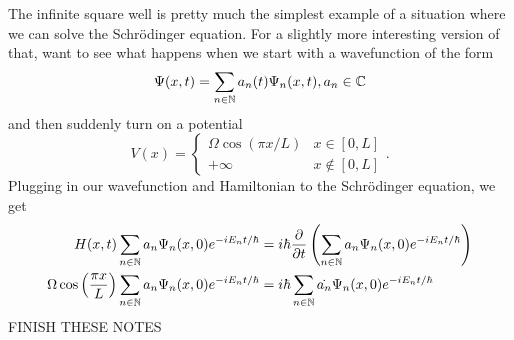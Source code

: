 \documentclass{article}
\begin{document}
The infinite square well is pretty much the simplest example of a situation where we can solve the Schrödinger equation. For a slightly more interesting version of that, want to see what happens when we start with a wavefunction of the form
\[ \Psi(x,t) = \sum_{n \in \mathbb{N}} a_n(t) \Psi_n(x, t), a_n \in \mathbb{C} \]
and then suddenly turn on a potential
\[ V(x) = \begin{cases}
    \Omega \cos (\pi x /L) & x \in [0, L] \\
    +\infty & x \not\in [0, L]
\end{cases}. \]
Plugging in our wavefunction and Hamiltonian to the Schrödinger equation, we get
\begin{align*}
    H(x, t) \sum_{n \in \mathbb{N}} a_n \Psi_n(x, 0) e^{-i E_n t / \hbar} &= i \hbar \frac{\partial}{\partial t} \left( \sum_{n \in \mathbb{N}} a_n \Psi_n(x, 0) e^{-i E_n t / \hbar} \right) \\
\Omega \cos \left( \frac{\pi x}{L} \right)  \sum_{n \in \mathbb{N}} a_n \Psi_n(x, 0) e^{-i E_n t / \hbar} &= i \hbar \sum_{n \in \mathbb{N}} \dot{a_n} \Psi_n(x, 0) e^{-i E_n t / \hbar} \\
\end{align*}
FINISH THESE NOTES
\end{document}
